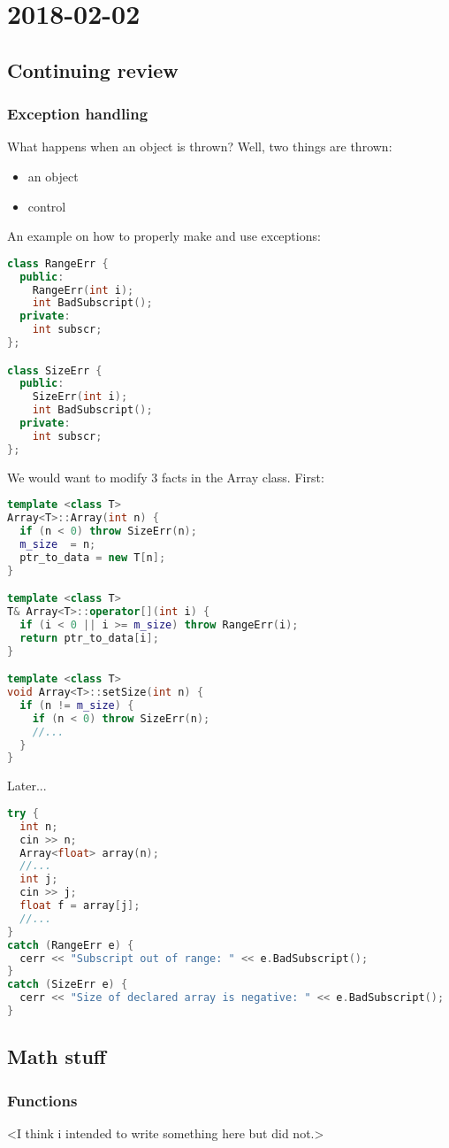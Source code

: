 \section{2018-02-02}

\subsection{Continuing review}

\subsubsection{Exception handling}

What happens when an object is thrown? Well, two things are thrown:

\begin{itemize}
  \item an object
  \item control
\end{itemize}

An example on how to properly make and use exceptions:

\begin{lstlisting}[language=C++]
class RangeErr {
  public:
    RangeErr(int i);
    int BadSubscript();
  private:
    int subscr; 
};

class SizeErr {
  public:
    SizeErr(int i);
    int BadSubscript();
  private:
    int subscr; 
};
\end{lstlisting}

We would want to modify 3 facts in the Array class. First:

\begin{lstlisting}[language=C++]
template <class T>
Array<T>::Array(int n) {
  if (n < 0) throw SizeErr(n);
  m_size  = n;
  ptr_to_data = new T[n];
}

template <class T>
T& Array<T>::operator[](int i) {
  if (i < 0 || i >= m_size) throw RangeErr(i);
  return ptr_to_data[i];
}

template <class T>
void Array<T>::setSize(int n) {
  if (n != m_size) {
    if (n < 0) throw SizeErr(n);
    //...
  }
}
\end{lstlisting}

Later...

\begin{lstlisting}[language=C++]
try {
  int n;
  cin >> n;
  Array<float> array(n);
  //...
  int j;
  cin >> j;
  float f = array[j];
  //...
}
catch (RangeErr e) {
  cerr << "Subscript out of range: " << e.BadSubscript();
}
catch (SizeErr e) {
  cerr << "Size of declared array is negative: " << e.BadSubscript();
}
\end{lstlisting}

\subsection{Math stuff}

\subsubsection{Functions}

<I think i intended to write something here but did not.>
